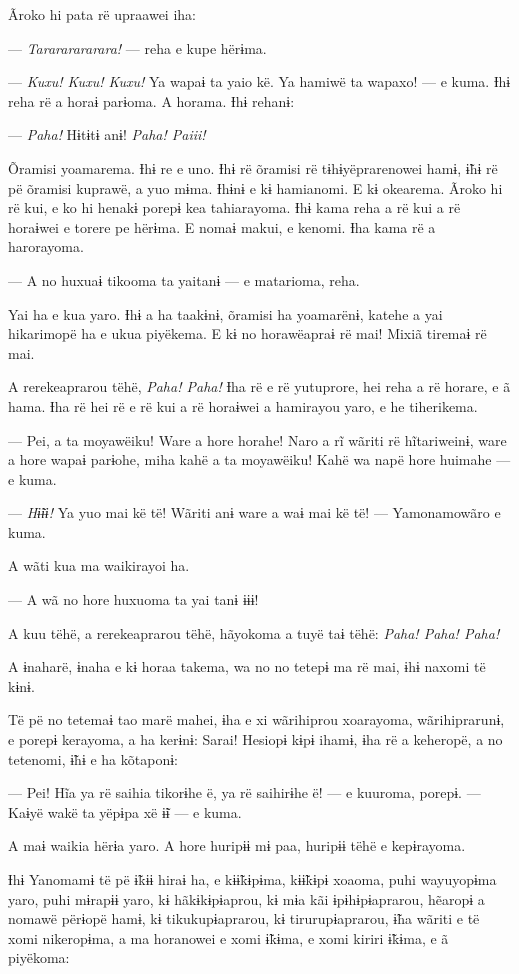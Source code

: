 Ãroko hi pata rë upraawei iha:

--- \textit{Tarararararara!} --- reha e kupe hërɨma. 

--- \textit{Kuxu! Kuxu! Kuxu!} Ya wapaɨ ta yaio kë. Ya hamiwë ta wapaxo! --- e
kuma. Ɨhɨ reha rë a horaɨ parɨoma. A horama. Ɨhɨ rehanɨ: 

--- \textit{Paha!} Hɨtɨtɨ anɨ! \textit{Paha! Paiii!} 

Õramisi yoamarema. Ɨhɨ re e uno. Ɨhɨ rë õramisi rë tɨhɨyëprarenowei
hamɨ, ɨ̃hɨ rë pë õramisi kuprawë, a yuo mɨma. Ɨhɨnɨ e kɨ hamianomi. E kɨ
okearema. Ãroko hi rë kui, e ko hi henakɨ porepɨ kea tahiarayoma. Ɨhɨ
kama reha a rë kui a rë horaɨwei e torere pe hërɨma. E nomaɨ makui, e
kenomi. Ɨha kama rë a harorayoma. 

--- A no huxuaɨ tikooma ta yaitanɨ --- e matarioma, reha. 

Yai ha e kua yaro. Ɨhɨ a ha taakɨnɨ, õramisi ha yoamarënɨ, katehe a yai
hikarimopë ha e ukua piyëkema. E kɨ no horawëapraɨ rë mai! Mixiã tiremaɨ
rë mai. 

A rerekeaprarou tëhë, \textit{Paha! Paha!} Ɨha rë e rë yutuprore, hei reha a rë
horare, e ã hama. Ɨha rë hei rë e rë kui a rë horaɨwei a hamirayou yaro,
e he tiherikema. 

--- Pei, a ta moyawëiku! Ware a hore horahe! Naro a rĩ wãriti rë
hĩtariweinɨ, ware a hore wapaɨ parɨohe, miha kahë a ta moyawëiku! Kahë
wa napë hore huimahe --- e kuma. 

--- \textit{Hɨ̃ɨɨ!} Ya yuo mai kë të! Wãriti anɨ ware a waɨ mai kë të! ---
Yamonamowãro e kuma. 

A wãti kua ma waikirayoi ha. 

--- A wã no hore huxuoma ta yai tanɨ ɨɨɨ!

A kuu tëhë, a rerekeaprarou tëhë, hãyokoma a tuyë taɨ tëhë: \textit{Paha! Paha!
Paha!} 

A ɨnaharë, ɨnaha e kɨ horaa takema, wa no no tetepɨ ma rë mai, ɨhɨ
naxomi të kɨnɨ. 

Të pë no tetemaɨ tao marë mahei, ɨha e xi wãrihiprou xoarayoma,
wãrihiprarunɨ, e porepɨ kerayoma, a ha kerɨnɨ: Sarai! Hesiopɨ kɨpɨ
ihamɨ, ɨha rë a keheropë, a no tetenomi, ɨ̃hɨ e ha kõtaponɨ:

--- Pei! Hĩa ya rë saihia tikorɨhe ë, ya rë saihirɨhe ë! --- e kuuroma,
porepɨ. --- Kaɨyë wakë ta yëpɨpa xë ɨ̃ɨ --- e kuma. 

A maɨ waikia hërɨa yaro. A hore huripɨɨ mɨ paa, huripɨɨ tëhë e
kepɨrayoma. 

Ɨhɨ Yanomamɨ të pë ɨ̃kɨɨ hiraɨ ha, e kɨɨ̃kɨpɨma, kɨɨ̃kɨpɨ xoaoma, puhi
wayuyopɨma yaro, puhi mɨrapɨɨ yaro, kɨ hãkɨkɨpɨaprou, kɨ mɨa kãi
ɨpɨhɨpɨaprarou, hẽaropɨ a nomawë përɨopë hamɨ, kɨ tikukupɨaprarou, kɨ
tirurupɨaprarou, ɨ̃ha wãriti e të xomi nikeropɨma, a ma horanowei e xomi
ɨ̃kɨma, e xomi kiriri ɨ̃kɨma, e ã piyëkoma:

